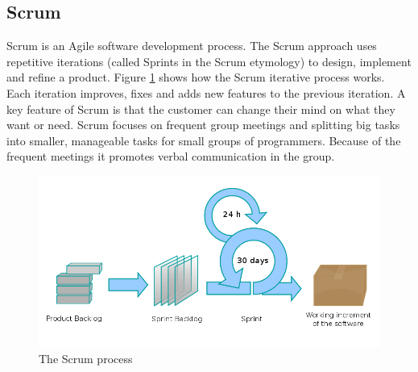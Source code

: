 \subsection{Scrum} 
\label{section:scrum}
Scrum is an Agile software development process. The Scrum approach uses repetitive iterations (called
Sprints in the Scrum etymology) to design, implement and refine a product. Figure \ref{fig:designmodel-scrum} shows
how the Scrum iterative process works. Each iteration improves, fixes and adds new features to the previous iteration.
A key feature of Scrum is that the customer can change their mind on what they want or need. Scrum focuses on frequent 
group meetings and splitting big tasks into smaller, manageable tasks for small groups of programmers. Because of the
frequent meetings it promotes verbal communication in the group.
\begin{figure}[h!]
\centering \includegraphics[scale=0.4]{img/designmodel-scrum}
\caption{The Scrum process\cite{link:wiki-scrum}}
\label{fig:designmodel-scrum}
\end{figure}

